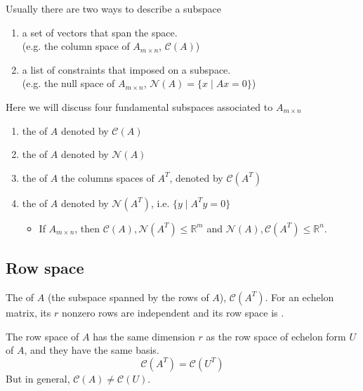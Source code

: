 Usually there are two ways to describe a subspace
\begin{enumerate}[label=(\roman*)]
    \item a set of vectors that span the space. \\
    (e.g. the column space of $A_{m \times n}$, $\mathcal{C}(A)$)
    \item a list of constraints that imposed on a subspace. \\
    (e.g. the null space of $A_{m \times n}$, $\mathcal{N}(A) = \{x \mid Ax = 0\}$)
\end{enumerate}
Here we will discuss four fundamental subspaces associated to $A_{m \times n}$
\begin{enumerate}[label=(\arabic*)]
    \item the  of $A$ denoted by $\mathcal{C}(A)$
    \item the  of $A$ denoted by $\mathcal{N}(A)$
    \item the  of $A$ the columns spaces of $A^T$, denoted by $\mathcal{C}(A^T)$
    \item the  of $A$ denoted by $\mathcal{N}(A^T)$, i.e. $\{y \mid A^T y = 0\}$
    \begin{itemize}
        \item If $A_{m\times n}$, then $\mathcal{C}(A), \mathcal{N}(A^T) \leq \mathbb{R}^m$ and $\mathcal{N}(A), \mathcal{C}(A^T) \leq \mathbb{R}^n$.
    \end{itemize}
\end{enumerate}

\subsection{Row space}

The  of $A$ (the subspace spanned by the rows of $A$), $\mathcal{C}(A^T)$. For an echelon matrix, its $r$ nonzero rows are independent and its row space is .

\begin{proposition}
    The row space of $A$ has the same dimension $r$ as the row space of echelon form $U$ of $A$, and they have the same basis.
    \[
        \mathcal{C}(A^T) = \mathcal{C}(U^T)
    \]
    But in general, $\mathcal{C}(A) \neq \mathcal{C}(U)$.
\end{proposition}
